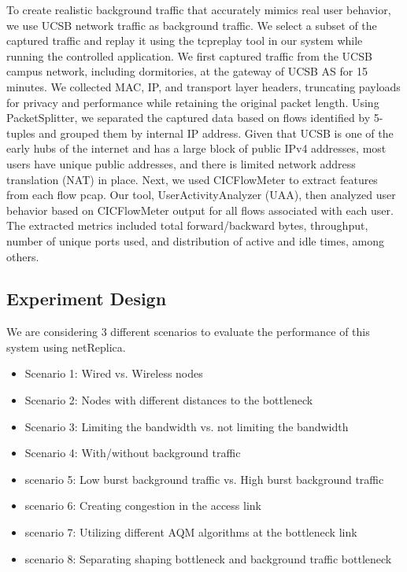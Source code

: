 To create realistic background traffic that accurately mimics real user behavior, we use UCSB network traffic as background traffic. We select a subset of the captured traffic and replay it using the tcpreplay tool in our system while running the controlled application. 
We first captured traffic from the UCSB campus network, including dormitories, at the gateway of UCSB AS for 15 minutes. We collected MAC, IP, and transport layer headers, truncating payloads for privacy and performance while retaining the original packet length. Using PacketSplitter, we separated the captured data based on flows identified by 5-tuples and grouped them by internal IP address. Given that UCSB is one of the early hubs of the internet and has a large block of public IPv4 addresses, most users have unique public addresses, and there is limited network address translation (NAT) in place.
Next, we used CICFlowMeter to extract features from each flow pcap. Our tool, UserActivityAnalyzer (UAA), then analyzed user behavior based on CICFlowMeter output for all flows associated with each user. The extracted metrics included total forward/backward bytes, throughput, number of unique ports used, and distribution of active and idle times, among others.



\subsection{Experiment Design}
We are considering 3 different scenarios to evaluate the performance of this system using netReplica. 
\begin{itemize}
    \item Scenario 1: Wired vs. Wireless nodes 
    \item Scenario 2: Nodes with different distances to the bottleneck 
    \item Scenario 3: Limiting the bandwidth vs. not limiting the bandwidth
    \item Scenario 4: With/without background traffic
    \item scenario 5: Low burst background traffic vs. High burst background traffic
    \item scenario 6: Creating congestion in the access link 
    \item scenario 7: Utilizing different AQM algorithms at the bottleneck link
    \item scenario 8: Separating shaping bottleneck and background traffic bottleneck
\end{itemize}
